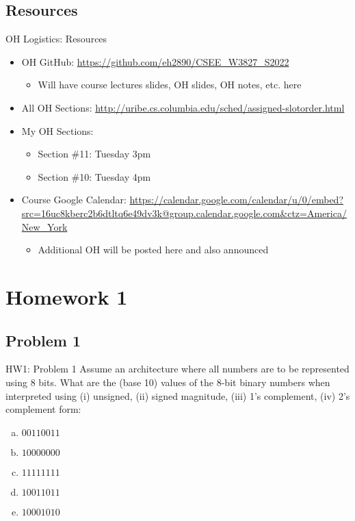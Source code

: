\documentclass{../slides}
\begin{document}
\subsection{Resources}
\begin{frame}{OH Logistics: Resources}
    \begin{itemize}
        \item OH GitHub: \url{https://github.com/eh2890/CSEE_W3827_S2022}
        \begin{itemize}
            \item Will have course lectures slides, OH slides, OH notes, etc. here
        \end{itemize}
        \item All OH Sections: \url{http://uribe.cs.columbia.edu/sched/assigned-slotorder.html}
        \item My OH Sections:
        \begin{itemize}
            \item Section \#11: Tuesday 3pm
            \item Section \#10: Tuesday 4pm
        \end{itemize}
        \item Course Google Calendar: \url{https://calendar.google.com/calendar/u/0/embed?src=16uc8kberc2b6dtltq6e49dv3k@group.calendar.google.com&ctz=America/New_York}
        \begin{itemize}
            \item Additional OH will be posted here and also announced
        \end{itemize}
    \end{itemize}
\end{frame}

\section{Homework 1}
\subsection{Problem 1}
\begin{frame}{HW1: Problem 1}
    Assume an architecture where all numbers are to be represented using 8 bits. What are the (base 10) values of the 8-bit binary numbers when interpreted using (i) unsigned, (ii) signed magnitude, (iii) 1’s complement, (iv) 2’s complement form:
    \begin{enumerate}[(a)]
        \item $00110011$
        \item $10000000$
        \item $11111111$
        \item $10011011$
        \item $10001010$
    \end{enumerate}
\end{frame}
\end{document}
